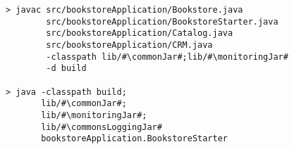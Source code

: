\begin{lstlisting}[caption=Command to compile and run the instrumented Bookstore under Windows,label=lst:bookstoreStarterWin]
> javac src/bookstoreApplication/Bookstore.java 
        src/bookstoreApplication/BookstoreStarter.java 
        src/bookstoreApplication/Catalog.java 
        src/bookstoreApplication/CRM.java 
        -classpath lib/#\commonJar#;lib/#\monitoringJar#
        -d build

> java -classpath build;
       lib/#\commonJar#;
       lib/#\monitoringJar#;
       lib/#\commonsLoggingJar#
       bookstoreApplication.BookstoreStarter 
\end{lstlisting}
